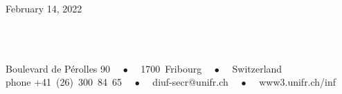 \begin{titlepage}
\begin{center}
February 14, 2022 %
\vspace*{.06\textheight}

\groupname\\\deptname\\ %
\vfill

\footnotesize{ Boulevard de Pérolles 90 ~~$\bullet$~~ 1700~Fribourg ~~$\bullet$~~ Switzerland
            \\
            phone +41~(26)~300~84~65 ~~$\bullet$~~ \textsf{diuf-secr@unifr.ch} ~~$\bullet$~~ \textsf{www3.unifr.ch/inf}
            }


\end{center}
\end{titlepage}
